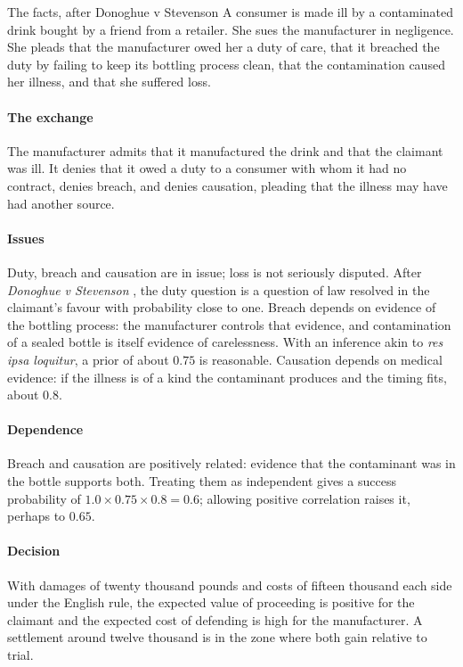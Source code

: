 \begin{casebox}{The facts, after Donoghue v Stevenson}
A consumer is made ill by a contaminated drink bought by a friend from a retailer. She sues the manufacturer in negligence. She pleads that the manufacturer owed her a duty of care, that it breached the duty by failing to keep its bottling process clean, that the contamination caused her illness, and that she suffered loss.
\end{casebox}

\paragraph{The exchange} The manufacturer admits that it manufactured the drink and that the claimant was ill. It denies that it owed a duty to a consumer with whom it had no contract, denies breach, and denies causation, pleading that the illness may have had another source.

\paragraph{Issues} Duty, breach and causation are in issue; loss is not seriously disputed. After \emph{Donoghue v Stevenson} \citep{donoghue1932}, the duty question is a question of law resolved in the claimant's favour with probability close to one. Breach depends on evidence of the bottling process: the manufacturer controls that evidence, and contamination of a sealed bottle is itself evidence of carelessness. With an inference akin to \emph{res ipsa loquitur}, a prior of about $0.75$ is reasonable. Causation depends on medical evidence: if the illness is of a kind the contaminant produces and the timing fits, about $0.8$.

\paragraph{Dependence} Breach and causation are positively related: evidence that the contaminant was in the bottle supports both. Treating them as independent gives a success probability of $1.0\times 0.75\times 0.8 = 0.6$; allowing positive correlation raises it, perhaps to $0.65$.

\paragraph{Decision} With damages of twenty thousand pounds and costs of fifteen thousand each side under the English rule, the expected value of proceeding is positive for the claimant and the expected cost of defending is high for the manufacturer. A settlement around twelve thousand is in the zone where both gain relative to trial.

